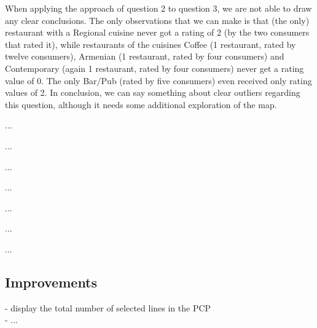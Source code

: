 When applying the approach of question 2 to question 3, we are not able to draw any clear conclusions. The only observations that we can make is that (the only) restaurant with a Regional cuisine never got a rating of 2 (by the two consumers that rated it), while restaurants of the cuisines Coffee (1 restaurant, rated by twelve consumers), Armenian (1 restaurant, rated by four consumers) and Contemporary (again 1 restaurant, rated by four consumers) never get a rating value of 0. The only Bar/Pub (rated by five consumers) even received only rating values of 2. In conclusion, we can say something about clear outliers regarding this question, although it needs some additional exploration of the map.

...

...

...

...

...

...

...


\subsection{Improvements}\label{sec:improvements}
- display the total number of selected lines in the PCP
\\- ...






